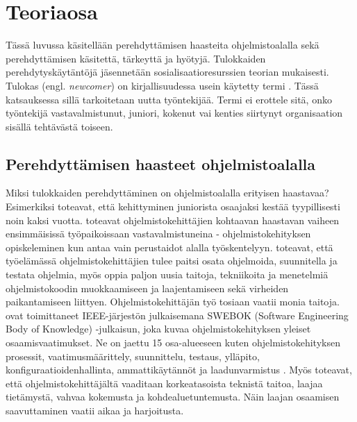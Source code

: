 \documentclass[utf8]{gradu3}
\begin{document}
\chapter{Teoriaosa}
\label{paaluku-teoria}

Tässä luvussa käsitellään perehdyttämisen haasteita ohjelmistoalalla sekä perehdyttämisen käsitettä, tärkeyttä ja hyötyjä. Tulokkaiden perehdytyskäytäntöjä jäsennetään sosialisaatioresurssien teorian \parencite{saks-gruman-2012} mukaisesti. Tulokas (engl. \textit{newcomer}) on kirjallisuudessa usein käytetty termi %
\parencites%
    [mm.][]{matturro-ym-2017}%
    {bauer-erdogan-2012}%
    {begel-simon-2008-all-over-again}%
    {steinmacher-ym-2015}%
    {britto-ym-2019}%
\relax.
%
Tässä katsauksessa sillä tarkoitetaan uutta työntekijää. Termi ei erottele sitä, onko työntekijä vastavalmistunut, juniori, kokenut vai kenties siirtynyt organisaation sisällä tehtävästä toiseen.

\section{Perehdyttämisen haasteet ohjelmistoalalla}

Miksi tulokkaiden perehdyttäminen on ohjelmistoalalla erityisen haastavaa? Esimerkiksi \textcite{bologa-lupu-2014} toteavat, että kehittyminen juniorista osaajaksi kestää tyypillisesti noin kaksi vuotta. \textcite{begel-simon-2008-all-over-again} toteavat ohjelmistokehittäjien kohtaavan haastavan vaiheen ensimmäisissä työpaikoissaan vastavalmistuneina - ohjelmistokehityksen opiskeleminen kun antaa vain perustaidot alalla työskentelyyn. \textcite{begel-simon-2008-all-over-again} toteavat, että työelämässä ohjelmistokehittäjien tulee paitsi osata ohjelmoida, suunnitella ja testata ohjelmia, myös oppia paljon uusia taitoja, tekniikoita ja menetelmiä ohjelmistokoodin muokkaamiseen ja laajentamiseen sekä virheiden paikantamiseen liittyen. Ohjelmistokehittäjän työ tosiaan vaatii monia taitoja. \textcite{swebok} ovat toimittaneet IEEE-järjestön julkaisemana SWEBOK (Software Engineering Body of Knowledge) -julkaisun, joka kuvaa ohjelmistokehityksen yleiset osaamisvaatimukset. Ne on jaettu 15 osa-alueeseen kuten ohjelmistokehityksen prosessit, vaatimusmäärittely, suunnittelu, testaus, ylläpito, konfiguraatioidenhallinta, ammattikäytännöt ja laadunvarmistus \parencite{swebok}. Myös \textcite{gregory-ym-2020} toteavat, että ohjelmistokehittäjältä vaaditaan korkeatasoista teknistä taitoa, laajaa tietämystä, vahvaa kokemusta ja kohdealuetuntemusta. Näin laajan osaamisen saavuttaminen vaatii aikaa ja harjoitusta.
\end{document}

